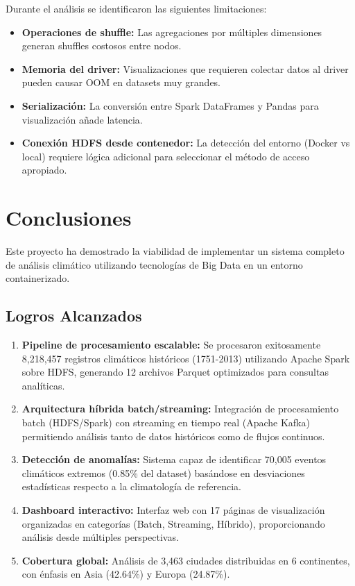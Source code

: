 \documentclass[12pt,a4paper]{scrartcl}
\begin{document}
Durante el análisis se identificaron las siguientes limitaciones:

\begin{itemize}
    \item \textbf{Operaciones de shuffle:} Las agregaciones por múltiples dimensiones generan shuffles costosos entre nodos.
    
    \item \textbf{Memoria del driver:} Visualizaciones que requieren colectar datos al driver pueden causar OOM en datasets muy grandes.
    
    \item \textbf{Serialización:} La conversión entre Spark DataFrames y Pandas para visualización añade latencia.
    
    \item \textbf{Conexión HDFS desde contenedor:} La detección del entorno (Docker vs local) requiere lógica adicional para seleccionar el método de acceso apropiado.
\end{itemize}


\section{Conclusiones}

Este proyecto ha demostrado la viabilidad de implementar un sistema completo de análisis climático utilizando tecnologías de Big Data en un entorno containerizado.

\subsection{Logros Alcanzados}

\begin{enumerate}
    \item \textbf{Pipeline de procesamiento escalable:} Se procesaron exitosamente 8,218,457 registros climáticos históricos (1751-2013) utilizando Apache Spark sobre HDFS, generando 12 archivos Parquet optimizados para consultas analíticas.
    
    \item \textbf{Arquitectura híbrida batch/streaming:} Integración de procesamiento batch (HDFS/Spark) con streaming en tiempo real (Apache Kafka) permitiendo análisis tanto de datos históricos como de flujos continuos.
    
    \item \textbf{Detección de anomalías:} Sistema capaz de identificar 70,005 eventos climáticos extremos (0.85\% del dataset) basándose en desviaciones estadísticas respecto a la climatología de referencia.
    
    \item \textbf{Dashboard interactivo:} Interfaz web con 17 páginas de visualización organizadas en categorías (Batch, Streaming, Híbrido), proporcionando análisis desde múltiples perspectivas.
    
    \item \textbf{Cobertura global:} Análisis de 3,463 ciudades distribuidas en 6 continentes, con énfasis en Asia (42.64\%) y Europa (24.87\%).
\end{enumerate}
\end{document}
